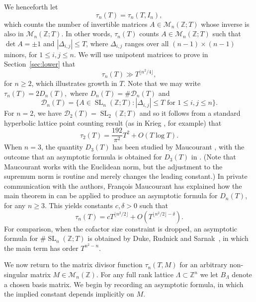 \documentclass[11pt,reqno]{amsart}
\def\({\left(}
\def\){\right)}
\theoremstyle{definition}
\theoremstyle{remark}
\newcommand{\SL}{\operatorname{SL}}
\numberwithin{equation}{section}
\numberwithin{thm}{section}
\numberwithin{table}{section}
\def\cD{{\mathcal D}}
\def\cM{{\mathcal M}}
\def \Z {{\mathbb Z}}
\newcommand{\ZZ}{\mathbb Z}
\begin{document}
We henceforth let 
\begin{equation}\label{eq:divisor-id}
\tau_n(T)=\tau_n(T,I_n),
\end{equation}
which counts the number of 
invertible matrices $A\in\cM_n\(\Z; T\)$ whose inverse is also in  $\cM_n\(\Z; T\)$.
In other words, $\tau_n(T)$ counts 
$A\in\cM_n\(\Z; T\)$ such that  $\det A=\pm 1$ and 
$|\Delta_{i,j}|\leq T$, where $\Delta_{i,j}$ ranges over  
all $(n-1)\times (n-1)$ minors, for $1\le i,j\le n$.
We will 
 use unipotent matrices to 
prove in Section~\ref{sec:lower} that 
\begin{equation}\label{eq:lower-easy}
\tau_n(T)\gg T^{\lfloor n^2/4\rfloor},
\end{equation}
for $n\geq 2$, which  illustrates growth in $T$. 
Note that we may write 
$
\tau_n(T)=2D_n(T),
$
where $D_n(T)=\#\cD_n(T)$ and
$$
\cD_n(T)=\{A \in \SL_n\(\Z; T\): |\Delta_{i,j}|\le T \text{ for $1\le i,j\le n$}\}.
$$
For $n=2$, we have $\cD_2(T)=\SL_2\(\Z; T\)$  and so it follows from a standard hyperbolic lattice point counting result (as in Krieg \cite{krieg}, for example) 
that 
\begin{equation}\label{eq:krieg}
\tau_2(T)=\frac{192}{\pi^2}T^2 +O(T \log T ).
\end{equation}
When  $n=3$, the quantity $D_3(T)$ has been studied by 
Maucourant
\cite{Mau}, 
with the outcome that an asymptotic formula is obtained for $D_3(T)$ 
 in \cite[Proposition 4.2]{Mau}.
(Note that Maucourant  works with the Euclidean norm, but the adjustment 
to the supremum norm is routine and merely changes the leading constant.)
 In private communication with the authors, Fran\c{c}ois Maucourant has explained how the main theorem in \cite{Mau} can be applied to 
 produce an asymptotic formula for  $D_n(T)$, for any $n\geq 3$.  
This yields 
 constants $c,\delta>0$ such that 
\begin{equation*}
\tau_n(T)=c T^{\lfloor n^2/2\rfloor} +O\left(T^{\lfloor n^2/2\rfloor-\delta}\right).
\end{equation*}
For comparison, when the cofactor size  constraint is dropped, 
 an asymptotic formula for  $\#\SL_n\(\Z; T\)$  is obtained by  Duke, Rudnick and Sarnak~\cite{DRS},  in which the main term has order $T^{n^2-n}$. 


We now return to  the matrix divisor function 
$\tau_n(T,M)$ for an arbitrary non-singular 
matrix  $M\in \cM_n(\Z)$. 
For any full rank lattice $\mathsf\Lambda\subset \ZZ^n$ we let $B_{\mathsf\Lambda}$ denote a chosen basis matrix. 
We begin by recording an asymptotic formula, in which the implied constant depends implicitly on $M$.
\end{document}
